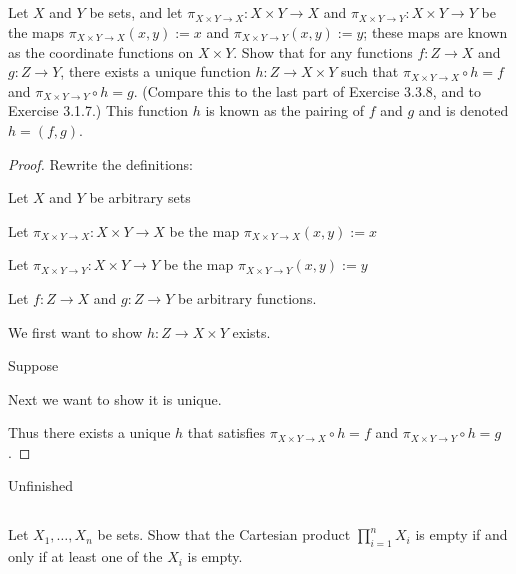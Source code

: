 \documentclass[../../main.tex]{subfiles}
\begin{document}
\addtocounter{subsection}{2}
\subsection{}
\begin{q}
    Let $X$ and $Y$ be sets, and let $\pi_{X\times Y\to X} : X \times Y \to X$ and $\pi_{X\times Y\to Y} : X \times Y \to Y$ be the maps $\pi_{X\times Y\to X}(x, y) := x$ and $\pi_{X\times Y\to Y}(x, y) := y$; these maps are known as the coordinate functions on $X\times Y$. Show that for any functions $f : Z \to X$ and $g : Z \to Y$, there exists a unique function $h : Z \to X \times Y$ such that $\pi_{X\times Y\to X} \circ h = f$ and $\pi_{X\times Y\to Y} \circ h = g$. (Compare this to the last part of Exercise 3.3.8, and to Exercise 3.1.7.) This function $h$ is known as the pairing of $f$ and $g$ and is denoted $h = (f, g)$.
\end{q}

\begin{proof}
    Rewrite the definitions:
    \begin{lxl}
        \item Let $X$ and $Y$ be arbitrary sets
        \item Let $\pi_{X\times Y\to X} : X \times Y \to X$ be the map $\pi_{X\times Y\to X}(x, y) := x$
        \item Let $\pi_{X\times Y\to Y} : X \times Y \to Y$ be the map $\pi_{X\times Y\to Y}(x, y) := y$
        \item Let $f : Z \to X$ and $g : Z \to Y$ be arbitrary functions.
    \end{lxl}
    We first want to show $h : Z \to X \times Y$ exists.
    \begin{lxl}[resume]
        \item Suppose 
    \end{lxl}
    Next we want to show it is unique.
    \begin{lxl}[resume]
        \item
    \end{lxl}
    Thus there exists a unique $h$ that satisfies $\pi_{X\times Y\to X} \circ h = f$ and $\pi_{X\times Y\to Y} \circ h = g$.
\end{proof}
\begin{xx}
    Unfinished
\end{xx}

\subsection{}
\begin{q}
    Let $X_1, \ldots, X_n$ be sets. Show that the Cartesian product $\prod_{i=1}^n X_i$ is empty if and only if at least one of the $X_i$ is empty.
\end{q}
\end{document}
